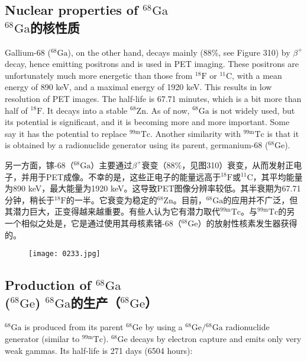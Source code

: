 \documentclass[dvipsnames, svgnames,a4paper,11pt]{article}
\begin{document}
\subsection{Nuclear properties of \(\mathrm{^{68}Ga}\)\\ \(\mathrm{^{68}Ga}\)的核性质}  
Gallium-68 (\(\mathrm{^{68}Ga}\)), on the other hand, decays mainly (88\%, see Figure 310) by \(\beta^{+}\) decay, hence emitting positrons and is used in PET imaging. These positrons are unfortunately much more energetic than those from \(\mathrm{^{18}F}\) or \(\mathrm{^{11}C}\), with a mean energy of 890 keV, and a maximal energy of 1920 keV. This results in low resolution of PET images. The half-life is 67.71 minutes, which is a bit more than half of \(\mathrm{^{18}F}\). It decays into a stable \(\mathrm{^{68}Zn}\). As of now, \(\mathrm{^{68}Ga}\) is not widely used, but its potential is significant, and it is becoming more and more important. Some say it has the potential to replace \(\mathrm{^{99m}Tc}\). Another similarity with \(\mathrm{^{99m}Tc}\) is that it is obtained by a radionuclide generator using its parent, germanium-68 (\(\mathrm{^{68}Ge}\)).

另一方面，镓-68（\(\mathrm{^{68}Ga}\)）主要通过\(\beta^{+}\)衰变（88\%，见图310）衰变，从而发射正电子，并用于PET成像。不幸的是，这些正电子的能量远高于\(\mathrm{^{18}F}\)或\(\mathrm{^{11}C}\)，其平均能量为890 keV，最大能量为1920 keV。这导致PET图像分辨率较低。其半衰期为67.71分钟，稍长于\(\mathrm{^{18}F}\)的一半。它衰变为稳定的\(\mathrm{^{68}Zn}\)。目前，\(\mathrm{^{68}Ga}\)的应用并不广泛，但其潜力巨大，正变得越来越重要。有些人认为它有潜力取代\(\mathrm{^{99m}Tc}\)。与\(\mathrm{^{99m}Tc}\)的另一个相似之处是，它是通过使用其母核素锗-68（\(\mathrm{^{68}Ge}\)）的放射性核素发生器获得的。

\begin{figure}[h]
	\centering
    \texttt{[image: 0233.jpg]}  
     \label{fig310}
\end{figure}

\subsection{Production of \(\mathrm{^{68}Ga}\)\\ (\(\mathrm{^{68}Ge}\)) \(\mathrm{^{68}Ga}\)的生产（\(\mathrm{^{68}Ge}\)）}  
\(\mathrm{^{68}Ga}\) is produced from its parent \(\mathrm{^{68}Ge}\) by using a \(\mathrm{^{68}Ge}/\mathrm{^{68}Ga}\) radionuclide generator (similar to \(\mathrm{^{99m}Tc}\)). \(\mathrm{^{68}Ge}\) decays by electron capture and emits only very weak gammas. Its half-life is 271 days (6504 hours):  
\end{document}

